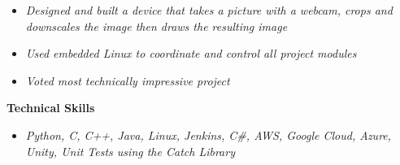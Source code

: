 \documentclass[8pt]{extarticle}
\begin{document}
\begin{itemize}
\item \textit{Designed and built a device that takes a picture with a webcam, crops and downscales the image then draws the
resulting image}
\item \textit{Used embedded Linux to coordinate and control all project modules}
\item \textit{Voted most technically impressive project}
\end{itemize}
\begin{changemargin}{-0.8cm}{0.0cm}
\textbf{Technical Skills}
\end{changemargin}
\vspace*{-0.4cm}
\makebox[\linewidth]{\rule{17cm}{0.4pt}}
\begin{itemize}
\item \textit{Python, C, C++, Java, Linux, Jenkins, C\#, AWS, Google Cloud, Azure, Unity, Unit Tests using the Catch Library}


\end{itemize}
\end{document}
